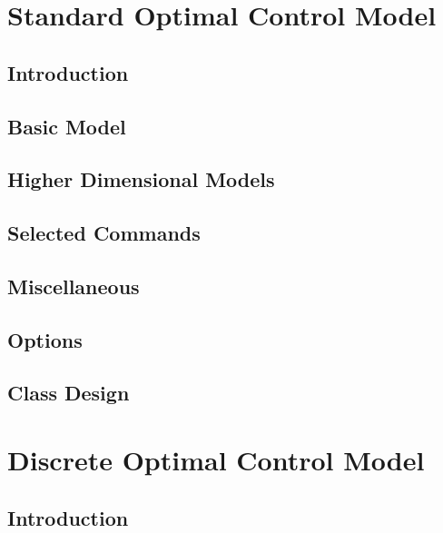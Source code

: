 \documentclass[11pt]{book}
\begin{document}

\frontmatter

\newpage
\tableofcontents
\preface{}

\part{Standard Optimal Control Model}
\label{part:user_man}
\chapter{Introduction}


\mainmatter 
\chapter{Basic Model}
\label{sec:standardmodel}


\chapter{Higher Dimensional Models}
\label{sec:twostatemodel}


\chapter{Selected Commands}
\label{ch:commands}


\chapter{Miscellaneous}
\label{ch:miscellaneous}


\appendix
\chapter{Options}
\label{sec:options}


\chapter{Class Design}
\label{sec:classdesign}



\part{Discrete Optimal Control Model}
\label{part:user_man_discrete}
\chapter{Introduction}


\clearpage
\printindex
\end{document}
